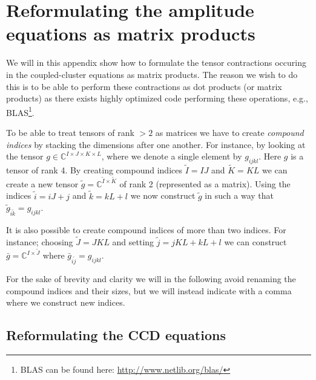 \chapter{Reformulating the amplitude equations as matrix products}
    \label{app:ccsd-dot-products}
    We will in this appendix show how to formulate the tensor contractions
    occuring in the coupled-cluster equations as matrix products. The reason we
    wish to do this is to be able to perform these contractions as dot products
    (or matrix products) as there exists highly optimized code performing these
    operations, e.g., BLAS\footnote{BLAS can be found here:
    \url{http://www.netlib.org/blas/}}.

    To be able to treat tensors of rank $> 2$ as matrices we have to create
    \emph{compound indices} by stacking the dimensions after one another. For
    instance, by looking at the tensor $g \in \mathbb{C}^{I \times J \times K
    \times L}$, where we denote a single element by $g_{ijkl}$. Here $g$ is a
    tensor of rank 4. By creating compound indices $\tilde{I} = IJ$ and
    $\tilde{K} = KL$ we can create a new tensor $\tilde{g} =
    \mathbb{C}^{\tilde{I} \times \tilde{K}}$ of rank 2 (represented as a
    matrix). Using the indices $\tilde{i} = iJ + j$ and $\tilde{k} = kL + l$ we
    now construct $\tilde{g}$ in such a way that $\tilde{g}_{\tilde{i}\tilde{k}}
    = g_{ijkl}$.

    It is also possible to create compound indices of more than two indices. For
    instance; choosing $\tilde{J} = JKL$ and setting $\tilde{j} = jKL + kL + l$
    we can construct $\bar{g} = \mathbb{C}^{I\times \tilde{J}}$ where
    $\bar{g}_{i\tilde{j}} = g_{ijkl}$.

    For the sake of brevity and clarity we will in the following avoid renaming
    the compound indices and their sizes, but we will instead indicate with a
    comma where we construct new indices.

    \section{Reformulating the CCD equations}

